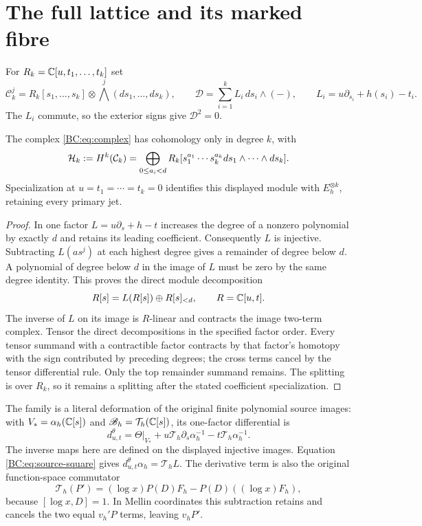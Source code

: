 \section{The full lattice and its marked fibre}

For $R_k=\mathbb C[u,t_1,\ldots,t_k]$ set
\begin{equation}
 \mathcal C_k^j=R_k[s_1,\ldots,s_k]\otimes
                  \bigwedge^j(ds_1,\ldots,ds_k),\qquad
 \mathcal D=\sum_{i=1}^k L_i\,ds_i\wedge(-),\qquad
 L_i=u\partial_{s_i}+h(s_i)-t_i.
 \label{BC:eq:complex}
\end{equation}
The $L_i$ commute, so the exterior signs give $\mathcal D^2=0$.

\begin{proposition}
The complex \eqref{BC:eq:complex} has cohomology only in degree $k$, with
\begin{equation}
 \mathcal H_k:=H^k(\mathcal C_k)
   =\bigoplus_{0\le a_i<d}R_k
       [s_1^{a_1}\cdots s_k^{a_k}ds_1\wedge\cdots\wedge ds_k].
 \label{BC:eq:lattice}
\end{equation}
Specialization at $u=t_1=\cdots=t_k=0$ identifies this displayed
module with $E_h^{\otimes k}$, retaining every primary jet.
\end{proposition}
\begin{proof}
In one factor $L=u\partial_s+h-t$ increases the degree of a nonzero
polynomial by exactly $d$ and retains its leading coefficient.
Consequently $L$ is injective.  Subtracting $L(as^j)$ at each highest
degree gives a remainder of degree below $d$.  A polynomial of degree
below $d$ in the image of $L$ must be zero by the same degree identity.
This proves the direct module decomposition
\[
 R[s]=L(R[s])\oplus R[s]_{<d},\qquad R=\mathbb C[u,t].
\]
The inverse of $L$ on its image is $R$-linear and contracts the image
two-term complex.  Tensor the direct decompositions in the specified
factor order.  Every tensor summand with a contractible factor contracts
by that factor's homotopy with the sign contributed by preceding degrees;
the cross terms cancel by the tensor differential rule.  Only the top
remainder summand remains.  The splitting is over $R_k$, so it remains a
splitting after the stated coefficient specialization.
\end{proof}

The family is a literal deformation of the original finite polynomial
source images: with $V_* =\alpha_h(\mathbb C[s])$ and
$\mathscr B_h=\mathcal T_h(\mathbb C[s])$, its one-factor differential is
\begin{equation}
 d^\theta_{u,t}=\Theta|_{V_*}
       +u\mathcal T_h\partial_s\alpha_h^{-1}
       -t\mathcal T_h\alpha_h^{-1}.
\end{equation}
The inverse maps here are defined on the displayed injective images.
Equation \eqref{BC:eq:source-square} gives
$d^\theta_{u,t}\alpha_h=\mathcal T_hL$.
The derivative term is also the original function-space commutator
\[
 \mathcal T_h(P')=(\log x)P(D)F_h-P(D)((\log x)F_h),
\]
because $[\log x,D]=1$.  In Mellin coordinates this subtraction
retains and cancels the two equal $v_h'P$ terms, leaving $v_hP'$.

